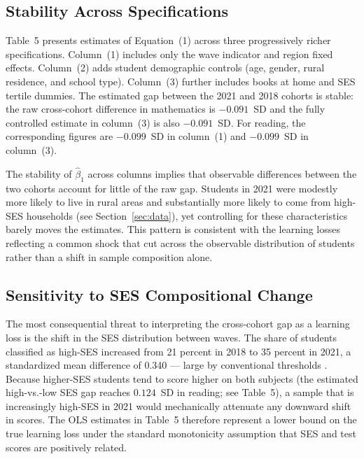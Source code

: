 
\subsection{Stability Across Specifications}
\label{subsec:stability}

Table~5 presents estimates of Equation~(1) across three progressively richer
specifications. Column~(1) includes only the wave indicator and region fixed
effects. Column~(2) adds student demographic controls (age, gender, rural
residence, and school type). Column~(3) further includes books at home and
SES tertile dummies. The estimated gap between the 2021 and 2018 cohorts
is stable: the raw cross-cohort difference in mathematics is $-0.091$~SD
and the fully controlled estimate in column~(3) is also $-0.091$~SD. For
reading, the corresponding figures are $-0.099$~SD in column~(1) and
$-0.099$~SD in column~(3).

The stability of $\hat{\beta}_1$ across columns implies that observable
differences between the two cohorts account for little of the raw gap.
Students in 2021 were modestly more likely to live in rural areas and
substantially more likely to come from high-SES households (see
Section~\ref{sec:data}), yet controlling for these characteristics barely
moves the estimates. This pattern is consistent with the learning losses
reflecting a common shock that cut across the observable distribution of
students rather than a shift in sample composition alone.

\subsection{Sensitivity to SES Compositional Change}
\label{subsec:ipw}

The most consequential threat to interpreting the cross-cohort gap as a
learning loss is the shift in the SES distribution between waves. The share
of students classified as high-SES increased from 21 percent in 2018 to
35 percent in 2021, a standardized mean difference of 0.340 --- large by
conventional thresholds \citep{austin2011introduction}. Because
higher-SES students tend to score higher on both subjects (the estimated
high-vs.-low SES gap reaches $0.124$~SD in reading; see Table~5), a
sample that is increasingly high-SES in 2021 would mechanically attenuate
any downward shift in scores. The OLS estimates in Table~5 therefore
represent a lower bound on the true learning loss under the standard
monotonicity assumption that SES and test scores are positively related.


